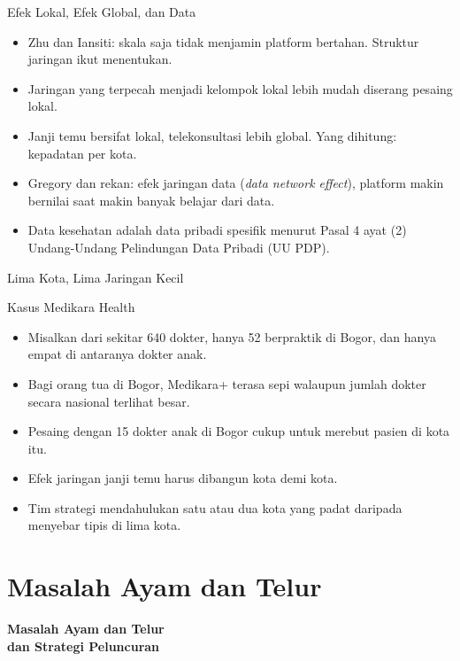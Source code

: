\documentclass[aspectratio=169, table, 12pt]{beamer}
\begin{document}
\begin{frame}{{\Large Efek Lokal, Efek Global, dan Data}}
  \begin{itemize}
    \item Zhu dan Iansiti: skala saja tidak menjamin platform bertahan. Struktur jaringan ikut menentukan.
    \item Jaringan yang terpecah menjadi kelompok lokal lebih mudah diserang pesaing lokal.
    \item Janji temu bersifat lokal, telekonsultasi lebih global. Yang dihitung: kepadatan per kota.
    \item Gregory dan rekan: efek jaringan data (\textit{data network effect}), platform makin bernilai saat makin banyak belajar dari data.
    \item Data kesehatan adalah data pribadi spesifik menurut Pasal 4 ayat (2) Undang-Undang Pelindungan Data Pribadi (UU PDP).
  \end{itemize}
\end{frame}

\begin{frame}{{\Large Lima Kota, Lima Jaringan Kecil}}
  \begin{block}{Kasus Medikara Health}
    \small
    \begin{itemize}
      \item Misalkan dari sekitar 640 dokter, hanya 52 berpraktik di Bogor, dan hanya empat di antaranya dokter anak.
      \item Bagi orang tua di Bogor, Medikara+ terasa sepi walaupun jumlah dokter secara nasional terlihat besar.
      \item Pesaing dengan 15 dokter anak di Bogor cukup untuk merebut pasien di kota itu.
      \item Efek jaringan janji temu harus dibangun kota demi kota.
      \item Tim strategi mendahulukan satu atau dua kota yang padat daripada menyebar tipis di lima kota.
    \end{itemize}
  \end{block}
\end{frame}

\section{Masalah Ayam dan Telur}

\begin{frame}{\hfill}
  \centering
  \Huge{\textbf{Masalah Ayam dan Telur\\dan Strategi Peluncuran}}
\end{frame}
\end{document}
